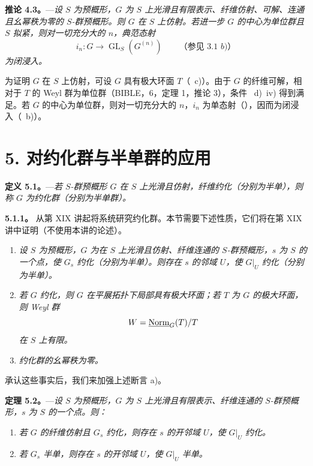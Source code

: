 \medskip
\noindent{}%
\textbf{推论 4.3。}---\textit{设 \(S\) 为预概形，\(G\) 为 \(S\) 上光滑且有限表示、纤维仿射、可解、连通且幺幂秩为零的 \(S\)-群预概形。则 \(G\) 在 \(S\) 上仿射。若进一步 \(G\) 的中心为单位群且 \(S\) 拟紧，则对一切充分大的 \(n\)，典范态射}
\[
  i_n:G\longrightarrow\operatorname{GL}_S(G^{(n)})
  \qquad\textit{（参见 3.1 b)）}
\]
\textit{为闭浸入。}

\medskip
为证明 \(G\) 在 \(S\) 上仿射，可设 \(G\) 具有极大环面 \(T\)（~c)）。由于 \(G\) 的纤维可解，相对于 \(T\) 的 Weyl 群为单位群（BIBLE，6，定理 1，推论 3），条件 ~d)~iv) 得到满足。若 \(G\) 的中心为单位群，则对一切充分大的 \(n\)，\(i_n\) 为单态射（），因而为闭浸入（~b)）。

%
\section*{5. 对约化群与半单群的应用}

\noindent{}%
\textbf{定义 5.1。}---\textit{若 \(S\)-群预概形 \(G\) 在 \(S\) 上光滑且仿射，纤维约化（分别为半单），则称 \(G\) 为\emph{约化群}（分别为\emph{半单群}）。}

\medskip
\noindent{}%
\textbf{5.1.1。}
从第 XIX 讲起将系统研究约化群。本节需要下述性质，它们将在第 XIX 讲中证明（不使用本讲的论述）。
\begin{enumerate}
\renewcommand{\labelenumi}{\textit{\alph{enumi})}}
\item \textit{设 \(S\) 为预概形，\(G\) 为在 \(S\) 上光滑且仿射、纤维连通的 \(S\)-群预概形，\(s\) 为 \(S\) 的一个点，使 \(G_s\) 约化（分别为半单）。则存在 \(s\) 的邻域 \(U\)，使 \(G|_U\) 约化（分别为半单）。}
\item \textit{若 \(G\) 约化，则 \(G\) 在平展拓扑下局部具有极大环面；若 \(T\) 为 \(G\) 的极大环面，则 Weyl 群}
\[
  W=\underline{\operatorname{Norm}}_G(T)/T
\]
\textit{在 \(S\) 上有限。}
\item \textit{约化群的幺幂秩为零。}
\end{enumerate}

承认这些事实后，我们来加强上述断言 a)。

\medskip
\noindent{}%
\textbf{定理 5.2。}---\textit{设 \(S\) 为预概形，\(G\) 为 \(S\) 上光滑且有限表示、纤维连通的 \(S\)-群预概形，\(s\) 为 \(S\) 的一个点。则：}
\begin{enumerate}
\renewcommand{\labelenumi}{\textit{(\roman{enumi})}}
\item \textit{若 \(G\) 的纤维仿射且 \(G_s\) 约化，则存在 \(s\) 的开邻域 \(U\)，使 \(G|_U\) 约化。}
\item \textit{若 \(G_s\) 半单，则存在 \(s\) 的开邻域 \(U\)，使 \(G|_U\) 半单。}
\end{enumerate}

